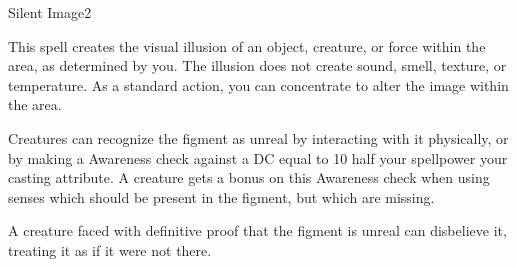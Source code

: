 \begin{spellsection}{Silent Image}{2}
    \begin{spellheader}
    \end{spellheader}
    \begin{spellcontent}
        \begin{spelltargetinginfo}
        \end{spelltargetinginfo}
        \begin{spelleffects}
            \spelleffect This spell creates the visual illusion of an object, creature, or force within the area, as determined by you. The illusion does not create sound, smell, texture, or temperature. As a standard action, you can concentrate to alter the image within the area.
            \spelldur \durshort
        \end{spelleffects}
    \end{spellcontent}
    \begin{spellfooter}
        \spellnotes Creatures can recognize the figment as unreal by interacting with it physically, or by making a Awareness check against a DC equal to 10 \add half your spellpower \add your casting attribute. A creature gets a  bonus on this Awareness check when using senses which should be present in the figment, but which are missing.

        A creature faced with definitive proof that the figment is unreal can disbelieve it, treating it as if it were not there.
        \miscastexplode
    \end{spellfooter}
\end{spellsection}

